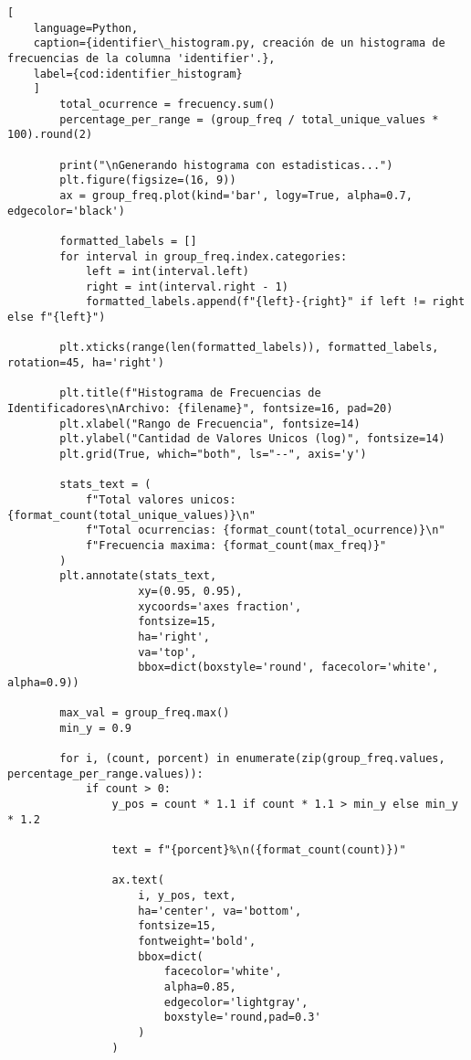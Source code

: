 \begin{lstlisting}[
    language=Python,
    caption={identifier\_histogram.py, creación de un histograma de frecuencias de la columna 'identifier'.},
    label={cod:identifier_histogram}
    ]
        total_ocurrence = frecuency.sum()
        percentage_per_range = (group_freq / total_unique_values * 100).round(2)
        
        print("\nGenerando histograma con estadisticas...")
        plt.figure(figsize=(16, 9)) 
        ax = group_freq.plot(kind='bar', logy=True, alpha=0.7, edgecolor='black')
        
        formatted_labels = []
        for interval in group_freq.index.categories:
            left = int(interval.left)
            right = int(interval.right - 1)
            formatted_labels.append(f"{left}-{right}" if left != right else f"{left}")
        
        plt.xticks(range(len(formatted_labels)), formatted_labels, rotation=45, ha='right')
        
        plt.title(f"Histograma de Frecuencias de Identificadores\nArchivo: {filename}", fontsize=16, pad=20)
        plt.xlabel("Rango de Frecuencia", fontsize=14)
        plt.ylabel("Cantidad de Valores Unicos (log)", fontsize=14)
        plt.grid(True, which="both", ls="--", axis='y')
        
        stats_text = (
            f"Total valores unicos: {format_count(total_unique_values)}\n"
            f"Total ocurrencias: {format_count(total_ocurrence)}\n"
            f"Frecuencia maxima: {format_count(max_freq)}"
        )
        plt.annotate(stats_text, 
                    xy=(0.95, 0.95), 
                    xycoords='axes fraction', 
                    fontsize=15,
                    ha='right', 
                    va='top',
                    bbox=dict(boxstyle='round', facecolor='white', alpha=0.9))
        
        max_val = group_freq.max()
        min_y = 0.9  
        
        for i, (count, porcent) in enumerate(zip(group_freq.values, percentage_per_range.values)):
            if count > 0:
                y_pos = count * 1.1 if count * 1.1 > min_y else min_y * 1.2
                
                text = f"{porcent}%\n({format_count(count)})"
                
                ax.text(
                    i, y_pos, text, 
                    ha='center', va='bottom', 
                    fontsize=15, 
                    fontweight='bold',
                    bbox=dict(
                        facecolor='white', 
                        alpha=0.85, 
                        edgecolor='lightgray', 
                        boxstyle='round,pad=0.3'
                    )
                )


\end{lstlisting}
